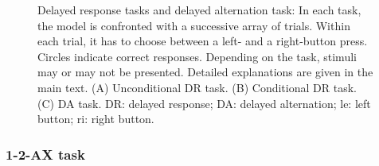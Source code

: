 \documentclass[
  11pt,
  a4paper,
]{scrbook}
\begin{document}
\begin{figure}


\caption{\label{fig-nn:fig2}Delayed response tasks and delayed
alternation task: In each task, the model is confronted with a
successive array of trials. Within each trial, it has to choose between
a left- and a right-button press. Circles indicate correct responses.
Depending on the task, stimuli may or may not be presented. Detailed
explanations are given in the main text. (A) Unconditional DR task. (B)
Conditional DR task. (C) DA task. DR: delayed response; DA: delayed
alternation; le: left button; ri: right button.}

\end{figure}%

\subsubsection*{1-2-AX task}\label{ax-task}
\end{document}
